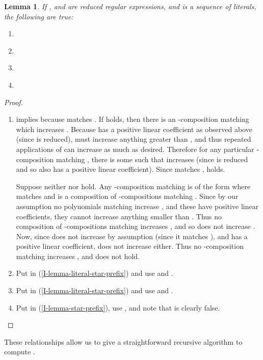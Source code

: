 \documentclass[11pt]{amsart}
\newtheorem{lemma}{Lemma}
\theoremstyle{definition}
\theoremstyle{remark}
\begin{document}
\begin{lemma} \label{I-lemma}
If ,  and  are reduced regular expressions, and  is a sequence of literals, the following are true:
\begin{enumerate}
\item  \label{I-lemma-literal-star-prefix}
\item  \label{I-lemma-literal-star}
\item  \label{I-lemma-star-prefix}
\item  \label{I-lemma-star}
\end{enumerate}
\end{lemma}
\begin{proof}
\begin{enumerate}
\item  implies  because  matches . If  holds, then there is an -composition  matching  which increases . Because  has a positive linear coefficient as observed above (since  is reduced),  must increase anything greater than , and thus repeated applications of  can increase  as much as desired. Therefore for any particular -composition  matching , there is some  such that  increases  (since  is reduced and so  also has a positive linear coefficient). Since  matches ,  holds.

Suppose neither  nor  hold. Any -composition matching  is of the form  where  matches  and  is a composition of -compositions matching . Since by our assumption no polynomials matching  increase , and these have positive linear coefficients, they cannot increase anything smaller than . Thus no composition of -compositions matching  increases , and so  does not increase . Now, since  does not increase  by assumption (since it matches ), and  has a positive linear coefficient,  does not increase  either. Thus no -composition matching  increases , and  does not hold.
\item Put  in (\ref{I-lemma-literal-star-prefix}) and use  and .
\item Put  in (\ref{I-lemma-literal-star-prefix}) and use  and .
\item Put  in (\ref{I-lemma-star-prefix}), use , and note that  is clearly false. \qedhere
\end{enumerate}
\end{proof}

These relationships allow us to give a straightforward recursive algorithm to compute .
\end{document}
